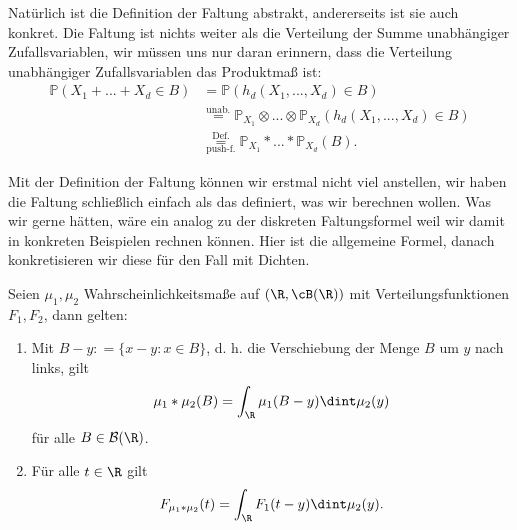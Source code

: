 \begin{bem}
	Nat\"urlich ist die Definition der Faltung abstrakt, andererseits ist sie auch konkret. Die Faltung ist nichts weiter als die Verteilung der Summe unabh\"angiger Zufallsvariablen, wir m\"ussen uns nur daran erinnern, dass die Verteilung unabh\"angiger Zufallsvariablen das Produktma\ss{} ist:
	\begin{align*}
		\mathbb{P}(X_1+...+X_d \in B) &= \mathbb{P}(h_d(X_1,...,X_d) \in B) \\
		&\overset{\text{unab.}}{=} \mathbb{P}_{X_1} \otimes ... \otimes \mathbb{P}_{X_d}(h_d(X_1,...,X_d) \in B)\\
		&\overset{\text{Def.}}{\underset{\text{push-f.}}{=}} \mathbb{P}_{X_1} *...*\mathbb{P}_{X_d}(B).
	\end{align*}
\end{bem}
Mit der Definition der Faltung k\"onnen wir erstmal nicht viel anstellen, wir haben die Faltung schlie\ss lich einfach als das definiert, was wir berechnen wollen. Was wir gerne h\"atten, w\"are ein analog zu der diskreten Faltungsformel weil wir damit in konkreten Beispielen rechnen k\"onnen. Hier ist die allgemeine Formel, danach konkretisieren wir diese f\"ur den Fall mit Dichten.
\begin{prop}\label{randomProp}
	Seien $\mu_1,\mu_2$ Wahrscheinlichkeitsmaße auf $(\R,\cB(\R))$ mit Verteilungsfunktionen $F_1,F_2$, dann gelten:
	\begin{enumerate}[label=(\roman*)]
		\item Mit $B-y: = \{ x-y\colon x \in B \}$, d. h. die Verschiebung der Menge $B$ um $y$ nach links, gilt \[ \mu_1 * \mu_2(B) = \int_{\R} \mu_1(B-y) \dint \mu_2(y)\] f\"ur alle $B\in \mathcal B(\R)$.
		\item F\"ur alle $t\in \R$ gilt \[ F_{\mu_1 * \mu_2}(t) = \int_{\R} F_1(t-y) \dint \mu_2(y).\]
	\end{enumerate}
\end{prop}

